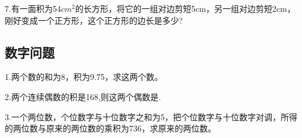 7.有一面积为54$cm^2$的长方形，将它的一组对边剪短5cm，另一组对边剪短2cm，刚好变成一个正方形，这个正方形的边长是多少?\par
\vspace{2cm}

\subsection{数字问题}
1.两个数的和为8，积为9.75，求这两个数。\par
\vspace{2cm}
 
2.两个连续偶数的积是168,则这两个偶数是.\par
\vspace{2cm}

3.一个两位数，个位数字与十位数字之和为5，把个位数字与十位数字对调，所得的两位数与原来的两位数的乘积为736，求原来的两位数。\par
\vspace{2cm}
 









